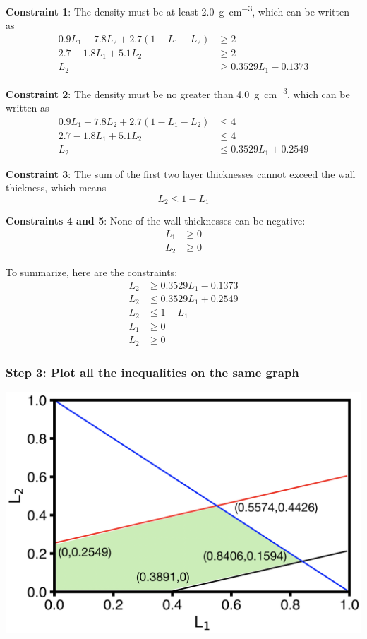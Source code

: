 \documentclass{article}
\begin{document}
\textbf{Constraint 1}:  The density must be at least \SI{2.0}{\gram\per\centi\meter\cubed}, which
can be written as
\begin{align*}
    0.9 L_1 + 7.8 L_2 + 2.7 \left( 1 - L_1 - L_2 \right) &\ge 2 \\
    2.7 - 1.8 L_1 + 5.1 L_2 &\ge 2 \\
    L_2 &\ge 0.3529 L_1 - 0.1373
\end{align*}

\textbf{Constraint 2}:  The density must be no greater than \SI{4.0}{\gram\per\centi\meter\cubed}, which
can be written as
\begin{align*}
    0.9 L_1 + 7.8 L_2 + 2.7 \left( 1 - L_1 - L_2 \right) &\le 4 \\
    2.7 - 1.8 L_1 + 5.1 L_2 &\le 4 \\
    L_2 &\le 0.3529 L_1 + 0.2549
\end{align*}

\textbf{Constraint 3}: The sum of the first two layer thicknesses cannot exceed the wall thickness,
which means
\[
    L_2 \le 1 - L_1
\]

\textbf{Constraints 4 and 5}: None of the wall thicknesses can be negative:
\begin{align*}
    L_1 &\ge 0 \\
    L_2 &\ge 0
\end{align*}

To summarize, here are the constraints:
\begin{align}
    L_2 &\ge 0.3529 L_1 - 0.1373 \\
    L_2 &\le 0.3529 L_1 + 0.2549 \\ 
    L_2 &\le 1 - L_1 \\
    L_1 &\ge 0 \\
    L_2 &\ge 0
\end{align}

\subsubsection*{Step 3: Plot all the inequalities on the same graph}

\begin{center}
    \includegraphics[scale=0.4]{Task4Plot.png}
\end{center}
\end{document}
